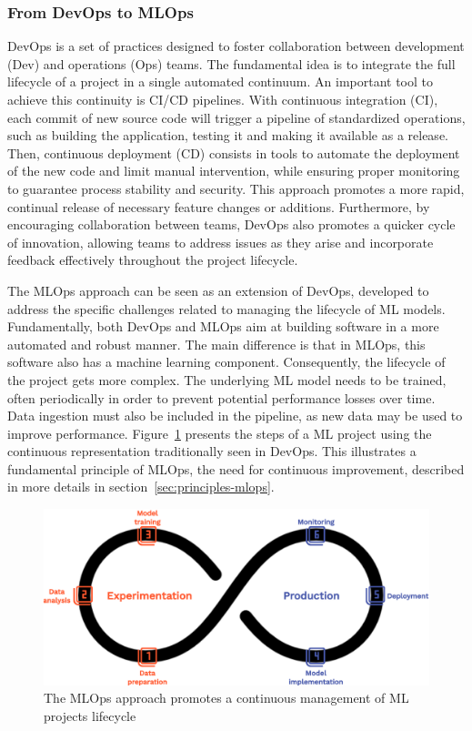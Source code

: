 \subsubsection{From DevOps to MLOps}
\label{subsubsec:devops-mlops}

DevOps is a set of practices designed to foster collaboration between development (Dev) and operations (Ops) teams. The fundamental idea is to integrate the full lifecycle of a project in a single automated continuum. An important tool to achieve this continuity is CI/CD pipelines. With continuous integration (CI), each commit of new source code will trigger a pipeline of standardized operations, such as building the application, testing it and making it available as a release. Then, continuous deployment (CD) consists in tools to automate the deployment of the new code and limit manual intervention, while ensuring proper monitoring to guarantee process stability and security. This approach promotes a more rapid, continual release of necessary feature changes or additions. Furthermore, by encouraging collaboration between teams, DevOps also promotes a quicker cycle of innovation, allowing teams to address issues as they arise and incorporate feedback effectively throughout the project lifecycle.

The MLOps approach can be seen as an extension of DevOps, developed to address the specific challenges related to managing the lifecycle of ML models. Fundamentally, both DevOps and MLOps aim at building software in a more automated and robust manner. The main difference is that in MLOps, this software also has a machine learning component. Consequently, the lifecycle of the project gets more complex. The underlying ML model needs to be trained, often periodically in order to prevent potential performance losses over time. Data ingestion must also be included in the pipeline, as new data may be used to improve performance. Figure~\ref{fig:mlops-cycle} presents the steps of a ML project using the continuous representation traditionally seen in DevOps. This illustrates a fundamental principle of MLOps, the need for continuous improvement, described in more details in section~\ref{sec:principles-mlops}.

\begin{figure}[htbp]
    \centering
    \includegraphics[width=\textwidth]{sections/img/mlops-cycle.png}
    \caption{The MLOps approach promotes a continuous management of ML projects lifecycle}
    \label{fig:mlops-cycle}
\end{figure}

